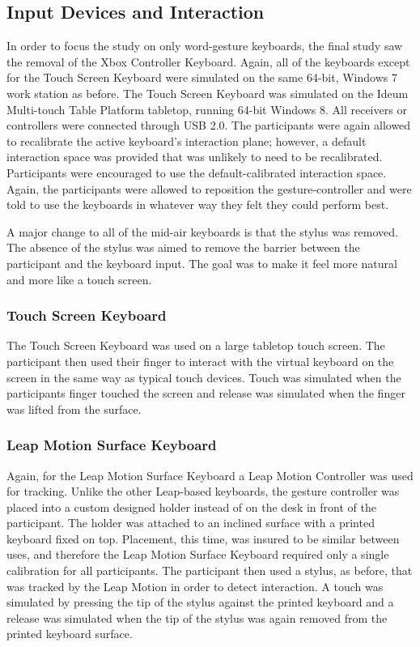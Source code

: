 \subsection{Input Devices and Interaction} \label{final_devices}
In order to focus the study on only word-gesture keyboards, the final study saw the removal of the Xbox Controller Keyboard. Again, all of the keyboards except for the Touch Screen Keyboard were simulated on the same 64-bit, Windows 7 work station as before. The Touch Screen Keyboard was simulated on the Ideum Multi-touch Table Platform tabletop, running 64-bit Windows 8. All receivers or controllers were connected through USB 2.0. The participants were again allowed  to recalibrate the active keyboard's interaction plane; however, a default interaction space was provided that was unlikely to need to be recalibrated. Participants were encouraged to use the default-calibrated interaction space. Again, the participants were allowed to reposition the gesture-controller and were told to use the keyboards in whatever way they felt they could perform best.

A major change to all of the mid-air keyboards is that the stylus was removed. The absence of the stylus was aimed to remove the barrier between the participant and the keyboard input. The goal was to make it feel more natural and more like a touch screen.

\subsubsection{Touch Screen Keyboard}
The Touch Screen Keyboard was used on a large tabletop touch screen. The participant then used their finger to interact with the virtual keyboard on the screen in the same way as typical touch devices. Touch was simulated when the participants finger touched the screen and release was simulated when the finger was lifted from the surface.

\subsubsection{Leap Motion Surface Keyboard}
Again, for the Leap Motion Surface Keyboard a Leap Motion Controller was used for tracking. Unlike the other Leap-based keyboards, the gesture controller was placed into a custom designed holder instead of on the desk in front of the participant. The holder was attached to an inclined surface with a printed keyboard fixed on top. Placement, this time, was insured to be similar between uses, and therefore the Leap Motion Surface Keyboard required only a single calibration for all participants. The participant then used a stylus, as before, that was tracked by the Leap Motion in order to detect interaction. A touch was simulated by pressing the tip of the stylus against the printed keyboard and a release was simulated when the tip of the stylus was again removed from the printed keyboard surface.

